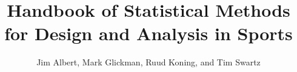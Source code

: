 \documentclass{book}
\begin{document}
\title{Handbook of Statistical Methods for Design and Analysis in Sports}
\author{Jim Albert, Mark Glickman, Ruud Koning, and Tim Swartz}

\begin{doublespace}
\maketitle 
\frontmatter
\tableofcontents
\mainmatter
{}


% 
\end{doublespace}


\end{document}
